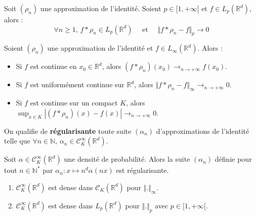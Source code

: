 
  \begin{theorem}
    Soit $(\rho_n)$ une approximation de l'identité. Soient $p \in [1, +\infty[$ et $f \in L_p(\mathbb{R}^d)$, alors :
    \[ \forall n \geq 1, \, f * \rho_n \in L_p(\mathbb{R}^d) \quad \text{ et } \quad \Vert f * \rho_n - f \Vert_p \longrightarrow 0 \]
  \end{theorem}

  \begin{theorem}
    Soient $(\rho_n)$ une approximation de l'identité et $f \in L_\infty(\mathbb{R}^d)$. Alors :
    \begin{itemize}
      \item Si $f$ est continue en $x_0 \in \mathbb{R}^d$, alors $(f * \rho_n)(x_0) \longrightarrow_{n \rightarrow +\infty} f(x_0)$.
      \item Si $f$ est uniformément continue sur $\mathbb{R}^d$, alors $\Vert f * \rho_n - f \Vert_\infty \longrightarrow_{n \rightarrow +\infty} 0$.
      \item Si $f$ est continue sur un compact $K$, alors $\sup_{x \in K} |(f * \rho_n)(x) - f(x)| \longrightarrow_{n \rightarrow +\infty} 0$.
    \end{itemize}
  \end{theorem}

  \begin{definition}
    On qualifie de \textbf{régularisante} toute suite $(\alpha_n)$ d'approximations de l'identité telle que $\forall n \in \mathbb{N}, \, \alpha_n \in \mathcal{C}^\infty_K(\mathbb{R}^d)$.
  \end{definition}

  \begin{example}
    Soit $\alpha \in \mathcal{C}^\infty_K(\mathbb{R}^d)$ une densité de probabilité. Alors la suite $(\alpha_n)$ définie pour tout $n \in \mathbb{N}^*$ par $\alpha_n : x \mapsto n^d \alpha(nx)$ est régularisante.
  \end{example}


  \begin{application}
    \begin{enumerate}[label={\bfseries(\roman*)}]
      \item $\mathcal{C}^\infty_K(\mathbb{R}^d)$ est dense dans $\mathcal{C}_K(\mathbb{R}^d)$ pour $\Vert . \Vert_\infty$.
      \item $\mathcal{C}^\infty_K(\mathbb{R}^d)$ est dense dans $L_p(\mathbb{R}^d)$ pour $\Vert . \Vert_p$ avec $p \in [1, +\infty[$.
    \end{enumerate}
  \end{application}

